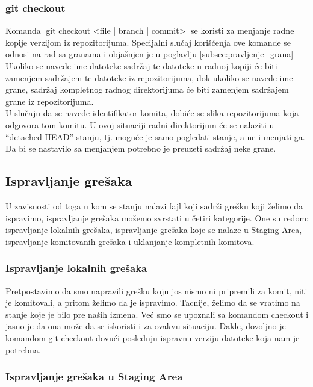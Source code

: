 \documentclass[a4paper]{article}
\begin{document}
{\subsubsection*{git checkout}
\label{checkout}
Komanda |git checkout <file | branch | commit>| se koristi za menjanje radne kopije verzijom iz repozitorijuma. Specijalni slučaj korišćenja ove komande se odnosi na rad sa granama i objašnjen je u poglavlju \ref{subsec:pravljenje_grana}\\
Ukoliko se navede ime datoteke sadržaj te datoteke u radnoj kopiji će biti zamenjem sadržajem te datoteke iz repozitorijuma, dok ukoliko se navede ime grane, sadržaj kompletnog radnog direktorijuma će biti zamenjem sadržajem grane iz repozitorijuma.\\
U slučaju da se navede identifikator komita, dobiće se slika repozitorijuma koja odgovora tom komitu. U ovoj situaciji radni direktorijum će se nalaziti u ``detached HEAD'' stanju, tj. moguće je samo pogledati stanje, a ne i menjati ga. Da bi se nastavilo sa menjanjem potrebno je preuzeti sadržaj neke grane.

\subsection{Ispravljanje grešaka}
\label{subsec:greske}

U zavisnosti od toga u kom se stanju nalazi fajl koji sadrži grešku koji želimo da ispravimo, ispravljanje grešaka možemo svrstati u četiri kategorije. One su redom: ispravljanje lokalnih grešaka, ispravljanje grešaka koje se nalaze u Staging Area, ispravljanje komitovanih grešaka i uklanjanje kompletnih komitova.

\subsubsection*{Ispravljanje lokalnih grešaka}
\label{lokalne_greske}
Pretpostavimo da smo napravili grešku koju jos nismo ni pripremili za komit, niti je komitovali, a pritom želimo da je ispravimo. Tacnije, želimo da se vratimo na stanje koje je bilo pre naših izmena. Već smo se upoznali sa komandom checkout i jasno je da ona može da se iskoristi i za ovakvu situaciju. Dakle, dovoljno je komandom git checkout dovući poslednju ispravnu verziju datoteke koja nam je potrebna.

\subsubsection*{Ispravljanje grešaka u Staging Area}
\label{staging_greske}

}
\end{document}
